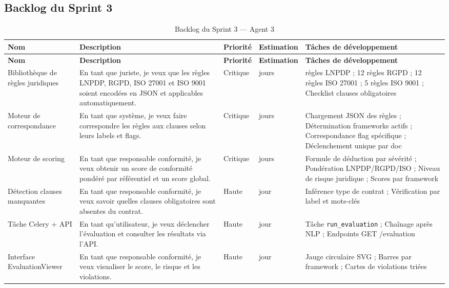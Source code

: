 \subsection{Backlog du Sprint 3}

\begin{longtable}{|>{\RaggedRight\arraybackslash}p{2.8cm}|>{\RaggedRight\arraybackslash}p{4.2cm}|>{\centering\arraybackslash}p{1.6cm}|>{\centering\arraybackslash}p{1.6cm}|>{\RaggedRight\arraybackslash}p{4.6cm}|}
\hline
\rowcolor[HTML]{D6E4F0}
\textbf{Nom} & \textbf{Description} & \textbf{Priorité} & \textbf{Estimation} & \textbf{Tâches de développement} \\
\hline
\endfirsthead
\hline
\rowcolor[HTML]{D6E4F0}
\textbf{Nom} & \textbf{Description} & \textbf{Priorité} & \textbf{Estimation} & \textbf{Tâches de développement} \\
\hline
\endhead
\hline
\endfoot
\caption{Backlog du Sprint 3 — Agent 3}
\label{tab:sprint3_agent3}
\endlastfoot

\rowcolor[HTML]{EBF5FB}
Bibliothèque de règles juridiques &
En tant que juriste, je veux que les règles LNPDP, RGPD, ISO 27001 et ISO 9001 soient encodées en JSON et applicables automatiquement. &
Critique & 3 jours &
15 règles LNPDP ; 12 règles RGPD ; 12 règles ISO 27001 ; 5 règles ISO 9001 ; Checklist clauses obligatoires \\
\hline

Moteur de correspondance &
En tant que système, je veux faire correspondre les règles aux clauses selon leurs labels et flags. &
Critique & 2 jours &
Chargement JSON des règles ; Détermination frameworks actifs ; Correspondance flag spécifique ; Déclenchement unique par doc \\
\hline

\rowcolor[HTML]{EBF5FB}
Moteur de scoring &
En tant que responsable conformité, je veux obtenir un score de conformité pondéré par référentiel et un score global. &
Critique & 2 jours &
Formule de déduction par sévérité ; Pondération LNPDP/RGPD/ISO ; Niveau de risque juridique ; Scores par framework \\
\hline

Détection clauses manquantes &
En tant que responsable conformité, je veux savoir quelles clauses obligatoires sont absentes du contrat. &
Haute & 1 jour &
Inférence type de contrat ; Vérification par label et mots-clés \\
\hline

\rowcolor[HTML]{EBF5FB}
Tâche Celery + API &
En tant qu'utilisateur, je veux déclencher l'évaluation et consulter les résultats via l'API. &
Haute & 1 jour &
Tâche \texttt{run\_evaluation} ; Chaînage après NLP ; Endpoints GET /evaluation \\
\hline

Interface EvaluationViewer &
En tant que responsable conformité, je veux visualiser le score, le risque et les violations. &
Haute & 1 jour &
Jauge circulaire SVG ; Barres par framework ; Cartes de violations triées \\
\hline

\end{longtable}

